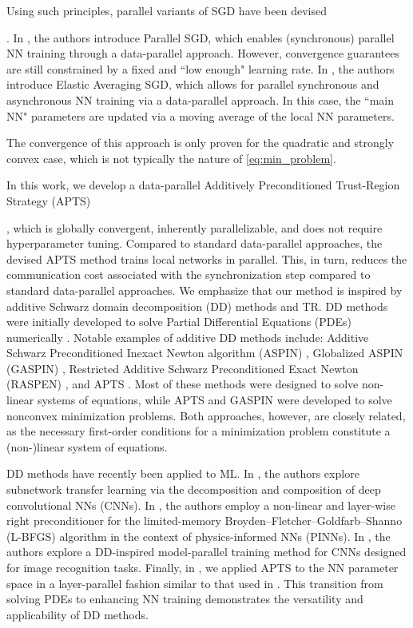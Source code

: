 \documentclass{article}
\begin{document}
Using such principles, parallel variants of SGD have been devised {\cite{zinkevichEtAl2010, zhangEtAl2015}. 
In \cite{zinkevichEtAl2010}, the authors introduce Parallel SGD, which enables (synchronous) parallel NN training through a data-parallel approach. 
However, convergence guarantees are still constrained by a fixed and ``low enough" learning rate. 
In \cite{zhangEtAl2015}, the authors introduce Elastic Averaging SGD, which allows for parallel synchronous and asynchronous NN training via a data-parallel approach. 
In this case, the ``main NN" parameters are updated via a moving average of the local NN parameters. 

The convergence of this approach is only proven for the quadratic and strongly convex case, which is not typically the nature of \eqref{eq:min_problem}. 

In this work, we develop a data-parallel Additively Preconditioned Trust-Region Strategy (APTS)}, which is globally convergent, inherently parallelizable, and does not require hyperparameter tuning. Compared to standard data-parallel approaches, the devised APTS method trains local networks in parallel. This, in turn, reduces the communication cost associated with the synchronization step compared to standard data-parallel approaches. We emphasize that our method is inspired by additive Schwarz domain decomposition (DD) methods and TR. DD methods were initially developed to solve Partial Differential Equations (PDEs) numerically \cite{chanEtAl1994, toselliWidlund2004, gander2006, erhelEtAl2014, mathew2008}.
Notable examples of additive DD methods include: Additive Schwarz Preconditioned Inexact Newton algorithm (ASPIN) \cite{caiKeyes2002}, Globalized ASPIN (GASPIN) \cite{grossKrause2021}, Restricted Additive Schwarz Preconditioned Exact Newton (RASPEN) \cite{doleanEtAl2016}, and APTS \cite{grossKrause2009}. 
Most of these methods were designed to solve non-linear systems of equations, while APTS and GASPIN were developed to solve nonconvex minimization problems. Both approaches, however, are closely related, as the necessary first-order conditions for a minimization problem constitute a (non-)linear system of equations. 

DD methods have recently been applied to ML.
In \cite{guEtAl2022, guEtAl2023}, the authors explore subnetwork transfer learning via the decomposition and composition of deep convolutional NNs (CNNs). 
In \cite{kopanickovaEtAl2023}, the authors employ a non-linear and layer-wise right preconditioner for the limited-memory Broyden–Fletcher–Goldfarb–Shanno (L-BFGS) algorithm in the context of physics-informed NNs (PINNs). 
In \cite{klawonnEtAl2023}, the authors explore a DD-inspired model-parallel training method for CNNs designed for image recognition tasks. 
Finally, in \cite{trottiEtAl2023}, we applied APTS to the NN parameter space in a layer-parallel fashion similar to that used in \cite{kopanickovaEtAl2023}. 
This transition from solving PDEs to enhancing NN training demonstrates the versatility and applicability of DD methods.\\
\end{document}
